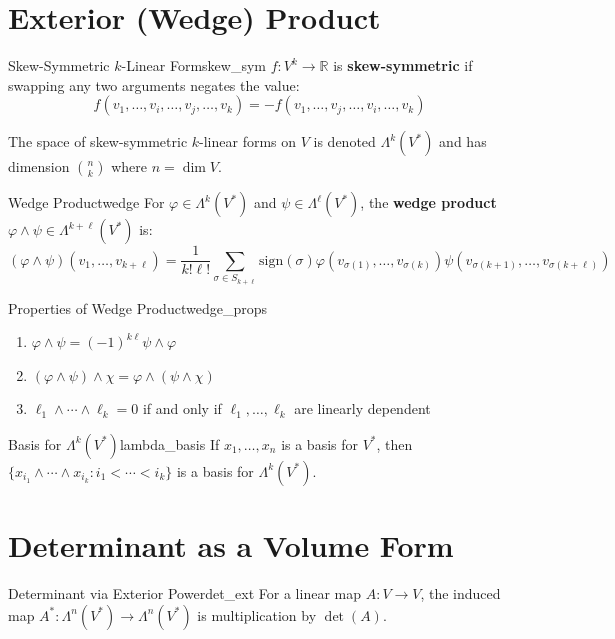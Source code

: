 \documentclass[11pt, letterpaper, openany]{book}
\begin{document}
\section{Exterior (Wedge) Product}

\begin{defn}{Skew-Symmetric $k$-Linear Form}{skew_sym}
$f: V^k \to \mathbb{R}$ is \textbf{skew-symmetric} if swapping any two arguments negates the value:
\[
f(v_1, \ldots, v_i, \ldots, v_j, \ldots, v_k) = -f(v_1, \ldots, v_j, \ldots, v_i, \ldots, v_k)
\]
\end{defn}

The space of skew-symmetric $k$-linear forms on $V$ is denoted $\Lambda^k(V^*)$ and has dimension $\binom{n}{k}$ where $n = \dim V$.

\begin{defn}{Wedge Product}{wedge}
For $\varphi \in \Lambda^k(V^*)$ and $\psi \in \Lambda^\ell(V^*)$, the \textbf{wedge product} $\varphi \wedge \psi \in \Lambda^{k+\ell}(V^*)$ is:
\[
(\varphi \wedge \psi)(v_1, \ldots, v_{k+\ell}) = \frac{1}{k!\ell!} \sum_{\sigma \in S_{k+\ell}} \text{sign}(\sigma) \varphi(v_{\sigma(1)}, \ldots, v_{\sigma(k)}) \psi(v_{\sigma(k+1)}, \ldots, v_{\sigma(k+\ell)})
\]
\end{defn}

\begin{thm}{Properties of Wedge Product}{wedge_props}
\begin{enumerate}
    \item $\varphi \wedge \psi = (-1)^{k\ell} \psi \wedge \varphi$
    \item $(\varphi \wedge \psi) \wedge \chi = \varphi \wedge (\psi \wedge \chi)$
    \item $\ell_1 \wedge \cdots \wedge \ell_k = 0$ if and only if $\ell_1, \ldots, \ell_k$ are linearly dependent
\end{enumerate}
\end{thm}

\begin{thm}{Basis for $\Lambda^k(V^*)$}{lambda_basis}
If $x_1, \ldots, x_n$ is a basis for $V^*$, then $\{x_{i_1} \wedge \cdots \wedge x_{i_k} : i_1 < \cdots < i_k\}$ is a basis for $\Lambda^k(V^*)$.
\end{thm}

\section{Determinant as a Volume Form}

\begin{thm}{Determinant via Exterior Power}{det_ext}
For a linear map $A: V \to V$, the induced map $A^*: \Lambda^n(V^*) \to \Lambda^n(V^*)$ is multiplication by $\det(A)$.
\end{thm}
\end{document}
